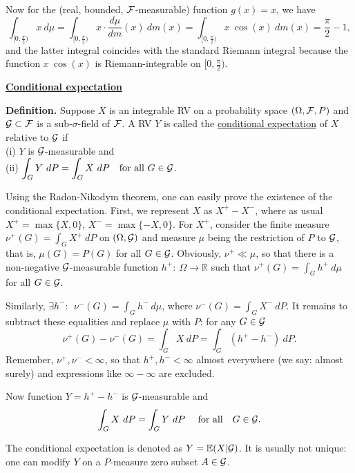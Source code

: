 \documentclass[a4paper,10pt]{article}
\def\RR{\mathbb{R}}
\def\EE{\mathbb{E}}
\newcommand{\1}[1]{\mathbf{1}_{\{#1\}}}
\begin{document}
Now for the (real, bounded, ${\cal F}$-measurable) function $g(x)=x$, we have
$$\int_{[0,\frac{\pi}{2})} x~d\mu=\int_{[0,\frac{\pi}{2})} x\cdot \frac{d\mu}{dm}(x)~dm(x)=\int_{[0,\frac{\pi}{2})} x~\cos(x) ~dm(x)=\frac{\pi}{2}-1,$$
and the latter integral coincides with the standard Riemann integral because the function $x~\cos(x)$ is Riemann-integrable on $[0,\frac{\pi}{2})$.
\vspace{3mm}

\begin{center}\bf\underline{Conditional expectation} \end{center}\vspace{3mm}

{\bf Definition.} Suppose $X$ is an integrable RV on a probability space $(\Omega,{\cal F},P)$ and ${\cal G}\subset{\cal F}$ is a sub-$\sigma$-field of $\cal F$. A RV $Y$ is called the \linebreak \underline{conditional expectation} of $X$ relative to $\cal G$ if\\
(i) $Y$ is $\cal G$-measurable and\\
(ii) $\displaystyle \int_{G} Y~dP=\int_{G} X~dP~~\mbox{ for all } G\in{\cal G}$.\vspace{3mm}

Using the Radon-Nikodym theorem, one can easily prove the existence of the conditional expectation. First, we represent $X$ as $X^+-X^-$, where as usual $X^+=\max\{X,0\}$, $X^-=\max\{-X,0\}$. For $X^+$, consider the finite measure $\nu^+(G)=\int_G X^+~dP$ on $(\Omega,{\cal G})$ and measure $\mu$ being the restriction of $P$ to $\cal G$, that is, $\mu(G)=P(G)$ for all $G\in{\cal G}$. Obviously, $\nu^+\ll\mu$, so that there is a non-negative ${\cal G}$-measurable function $h^+:~\Omega\to\RR$ such that $\nu^+(G)=\int_G h^+~d\mu$ for all $G\in{\cal G}$.

Similarly, $\exists h^-:~~\nu^-(G)=\int_G h^-~d\mu$, where $\nu^-(G)=\int_G X^-~dP$. It remains to subtract these equalities and replace $\mu$ with $P$: for any $G\in{\cal G}$
  $$\nu^+(G)-\nu^-(G)=\int_G X~dP=\int_G (h^+-h^-)~dP.$$
Remember, $\nu^+,\nu^-<\infty$, so that $h^+,h^-<\infty$ almost everywhere (we say: almost surely) and expressions like $\infty-\infty$ are excluded.

Now function $Y= h^+-h^-$ is ${\cal G}$-measurable and
  $$\int_G X~dP=\int_G Y~dP~~~\mbox{ for all }~~G\in{\cal G}.$$ \vspace{3mm}

The conditional expectation is denoted as $Y=\EE(X|{\cal G})$. It is usually not unique: one can modify $Y$ on a $P$-measure zero subset $A\in{\cal G}$.\vspace{3mm}
\end{document}
